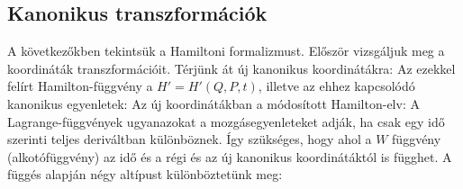   \subsection{Kanonikus transzformációk}
   
   A következőkben tekintsük a Hamiltoni formalizmust.
   Először vizsgáljuk meg a koordináták transzformációit.
   Térjünk át új kanonikus koordinátákra:
   Az ezekkel felírt Hamilton-függvény a $H'=H'(Q,P,t)$, illetve az ehhez kapcsolódó kanonikus egyenletek: 
   Az új koordinátákban a módosított Hamilton-elv:
   A Lagrange-függvények ugyanazokat a mozgásegyenleteket adják, ha csak egy idő szerinti teljes deriváltban különböznek. Így szükséges, hogy 
   ahol a $W$ függvény (alkotófüggvény) az idő és a régi és az új kanonikus koordinátáktól is függhet.
   A függés alapján négy altípust különböztetünk meg:
